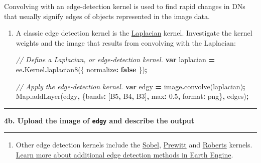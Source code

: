 \documentclass[
]{article}
\newenvironment{Shaded}{\begin{snugshade}}{\end{snugshade}}
\newcommand{\AttributeTok}[1]{\textcolor[rgb]{0.77,0.63,0.00}{#1}}
\newcommand{\BuiltInTok}[1]{#1}
\newcommand{\CommentTok}[1]{\textcolor[rgb]{0.56,0.35,0.01}{\textit{#1}}}
\newcommand{\DataTypeTok}[1]{\textcolor[rgb]{0.13,0.29,0.53}{#1}}
\newcommand{\FloatTok}[1]{\textcolor[rgb]{0.00,0.00,0.81}{#1}}
\newcommand{\FunctionTok}[1]{\textcolor[rgb]{0.00,0.00,0.00}{#1}}
\newcommand{\KeywordTok}[1]{\textcolor[rgb]{0.13,0.29,0.53}{\textbf{#1}}}
\newcommand{\NormalTok}[1]{#1}
\newcommand{\OperatorTok}[1]{\textcolor[rgb]{0.81,0.36,0.00}{\textbf{#1}}}
\newcommand{\StringTok}[1]{\textcolor[rgb]{0.31,0.60,0.02}{#1}}
\providecommand{\tightlist}{%
  \setlength{\itemsep}{0pt}\setlength{\parskip}{0pt}}
\begin{document}
Convolving with an edge-detection kernel is used to find rapid changes in DNs that usually signify edges of objects represented in the image data.

\begin{enumerate}
\def\labelenumi{\roman{enumi}.}
\item
  A classic edge detection kernel is the \href{https://en.wikipedia.org/wiki/Discrete_Laplace_operator}{Laplacian} kernel. Investigate the kernel weights and the image that results from convolving with the Laplacian:

\begin{Shaded}
\begin{Highlighting}[]
\CommentTok{// Define a Laplacian, or edge{-}detection kernel.}
\KeywordTok{var}\NormalTok{ laplacian }\OperatorTok{=}\NormalTok{ ee}\OperatorTok{.}\AttributeTok{Kernel}\OperatorTok{.}\FunctionTok{laplacian8}\NormalTok{(\{ }\DataTypeTok{normalize}\OperatorTok{:} \KeywordTok{false}\NormalTok{ \})}\OperatorTok{;}

\CommentTok{// Apply the edge{-}detection kernel.}
\KeywordTok{var}\NormalTok{ edgy }\OperatorTok{=}\NormalTok{ image}\OperatorTok{.}\FunctionTok{convolve}\NormalTok{(laplacian)}\OperatorTok{;}
\BuiltInTok{Map}\OperatorTok{.}\FunctionTok{addLayer}\NormalTok{(edgy}\OperatorTok{,}
\NormalTok{             \{}\DataTypeTok{bands}\OperatorTok{:}\NormalTok{ [}\StringTok{\textquotesingle{}B5\textquotesingle{}}\OperatorTok{,} \StringTok{\textquotesingle{}B4\textquotesingle{}}\OperatorTok{,} \StringTok{\textquotesingle{}B3\textquotesingle{}}\NormalTok{]}\OperatorTok{,} \DataTypeTok{max}\OperatorTok{:} \FloatTok{0.5}\OperatorTok{,} \DataTypeTok{format}\OperatorTok{:} \StringTok{\textquotesingle{}png\textquotesingle{}}\NormalTok{\}}\OperatorTok{,}
             \StringTok{\textquotesingle{}edges\textquotesingle{}}\NormalTok{)}\OperatorTok{;}
\end{Highlighting}
\end{Shaded}
\end{enumerate}

\begin{center}\rule{0.5\linewidth}{0.5pt}\end{center}

\textbf{4b. Upload the image of \texttt{edgy} and describe the output }

\begin{center}\rule{0.5\linewidth}{0.5pt}\end{center}

\begin{enumerate}
\def\labelenumi{\roman{enumi}.}
\setcounter{enumi}{1}
\tightlist
\item
  Other edge detection kernels include the \href{https://en.wikipedia.org/wiki/Sobel_operator}{Sobel}, \href{https://en.wikipedia.org/wiki/Prewitt_operator}{Prewitt} and \href{https://en.wikipedia.org/wiki/Roberts_cross}{Roberts} kernels. \href{https://developers.google.com/earth-engine/image_edges}{Learn more about additional edge detection methods in Earth Engine}.
\end{enumerate}
\end{document}

